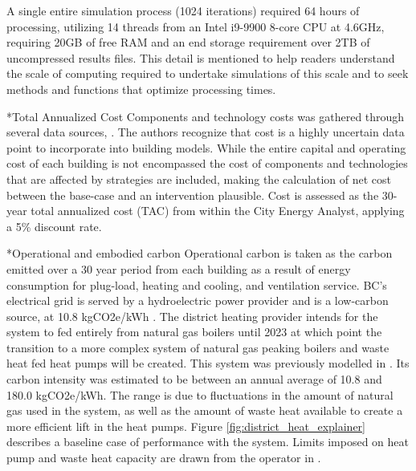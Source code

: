 \documentclass[twocolumn, a4paper,10pt]{article}
\makeatletter
\renewcommand\subsection{\@startsection{subsection}{1}{\z@}{\z@}{\z@}{\normalfont\normalsize\bfseries}}
\renewcommand\subsection{\@startsection{subsection}{1}{\z@}{\z@}{0.1pt}{\normalfont\normalsize\bfseries}}
\makeatother
\begin{document}
A single entire simulation process (1024 iterations) required 64 hours of processing, utilizing 14 threads from an Intel i9-9900 8-core CPU at 4.6GHz, requiring 20GB of free RAM and an end storage requirement over 2TB of uncompressed results files. This detail is mentioned to help readers understand the scale of computing required to undertake simulations of this scale and to seek methods and functions that optimize processing times. 

\subsection*{Total Annualized Cost}
Components and technology costs was gathered through several data sources, \citep{noauthor_cpcn_2014,schlueter_3for2_2016,salasovich_energy_2016,kegel_life_nodate,gordian_rsmeans_2020}. The authors recognize that cost is a highly uncertain data point to incorporate into building models. While the entire capital and operating cost of each building is not encompassed the cost of components and technologies that are affected by strategies are included, making the calculation of net cost between the base-case and an intervention plausible. Cost is assessed as the 30-year total annualized cost (TAC) from within the City Energy Analyst, applying a 5\% discount rate.

\subsection*{Operational and embodied carbon}
Operational carbon is taken as the carbon emitted over a 30 year period from each building as a result of energy consumption for plug-load, heating and cooling, and ventilation service. BC's electrical grid is served by a hydroelectric power provider and is a low-carbon source, at 10.8 kgCO2e/kWh \citep{bc_ministry_of_envrionmetn_and_climate_change_strategy_bc_2019}. The district heating provider intends for the system to fed entirely from natural gas boilers until 2023 at which point the transition to a more complex system of natural gas peaking boilers and waste heat fed heat pumps will be created. This system was previously modelled in \citet{mccarty_accepted_2020}. Its carbon intensity was estimated to be between an annual average of 10.8 and 180.0 kgCO2e/kWh. The range is due to fluctuations in the amount of natural gas used in the system, as well as the amount of waste heat available to create a more efficient lift in the heat pumps. Figure \ref{fig:district_heat_explainer} describes a baseline case of performance with the system. Limits imposed on heat pump and waste heat capacity are drawn from the operator in \citet{noauthor_infrastructure_2014}.
\end{document}
